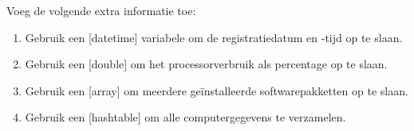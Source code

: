 
Voeg de volgende extra informatie toe:

\begin{enumerate}
\item Gebruik een [datetime] variabele om de registratiedatum en -tijd op te slaan.
\item Gebruik een [double] om het processorverbruik als percentage op te slaan.
\item Gebruik een [array] om meerdere ge\"installeerde softwarepakketten op te slaan.
\item Gebruik een [hashtable] om alle computergegevens te verzamelen.
\end{enumerate}

